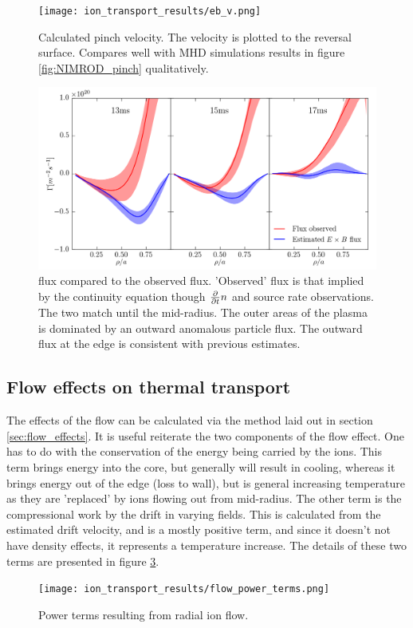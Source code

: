 \begin{figure}
    \centering
    \texttt{[image: ion\_transport\_results/eb\_v.png]}
    \caption[Calculated \ecb pinch velocity]{Calculated \ecb pinch velocity. The velocity is plotted to the reversal surface. Compares well with MHD simulations results in figure \ref{fig:NIMROD_pinch} qualitatively. }
    \label{fig:eb_v}
\end{figure}
\begin{figure}
    \centering
    \includegraphics{ion_transport_results/flux_comp.png}
    \caption[\ecb flux compared to measured flux]{\ecb flux compared to the observed flux. 'Observed' flux is that implied by the continuity equation though $\frac{\partial}{\partial t} n$ and source rate observations. The two match until the mid-radius. The outer areas of the plasma is dominated by an outward anomalous particle flux. The outward flux at the edge is consistent with previous estimates\cite{TakashisSource}. }
    \label{fig:eb_v}
\end{figure}

\subsection{Flow effects on thermal transport}

The effects of the flow can be calculated via the method laid out in section \ref{sec:flow_effects}. It is useful reiterate the two components of the flow effect. One has to do with the conservation of the energy being carried by the ions. This term brings energy into the core, but generally will result in cooling, whereas it brings energy out of the edge (loss to wall), but is general increasing temperature as they are 'replaced' by ions flowing out from mid-radius. The other term is the compressional work by the \ecb drift in varying fields. This is calculated from the estimated drift velocity, and is a mostly positive term, and since it doesn't not have density effects, it represents a temperature increase. The details of these two terms are presented in figure \ref{fig:flow_power_terms}. 

\begin{figure}
    \centering
    \texttt{[image: ion\_transport\_results/flow\_power\_terms.png]}
    \caption[Power terms resulting from radial ion flow]{Power terms resulting from radial ion flow.}
    \label{fig:flow_power_terms}
\end{figure}